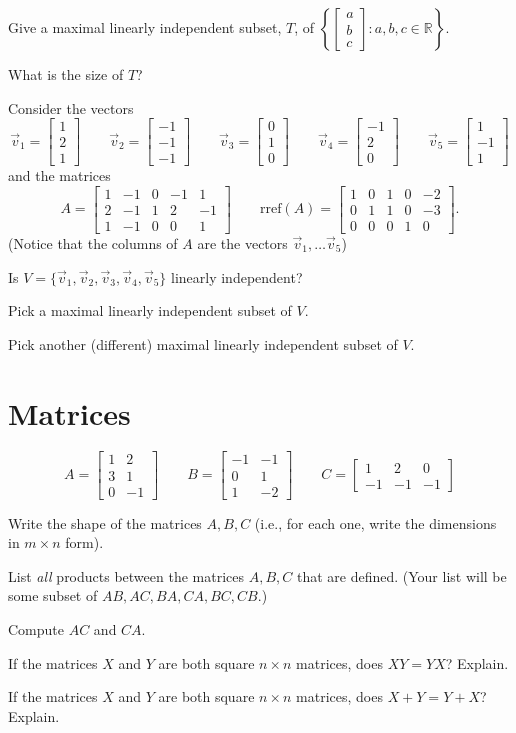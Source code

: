 \documentclass{article}
\newcommand{\R}{\mathbb{R}}
\newcommand{\rref}{\mathrm{rref}}
\newcommand{\mat}[1]{\begin{bmatrix}#1\end{bmatrix}}
\begin{document}
	\begin{Enum}
		\item Give a maximal linearly independent subset, $T$, of
		$\left\{\mat{a\\b\\c}:a,b,c\in \R\right\}$.
		\item What is the size of $T$?
	\end{Enum}

	Consider the vectors
	\[
		\vec v_1=\mat{1\\2\\1}
		\qquad
		\vec v_2=\mat{-1\\-1\\-1}
		\qquad
		\vec v_3=\mat{0\\1\\0}
		\qquad
		\vec v_4=\mat{-1\\2\\0}
		\qquad
		\vec v_5=\mat{1\\-1\\1}
	\]
	and the matrices
	\[
		A=\mat{1&-1&0&-1&1\\ 2&-1&1&2&-1\\1 & -1&0&0&1}
		\qquad \rref (A)
		=\mat{1&0&1&0&-2\\0&1&1&0&-3\\0&0&0&1&0}.
	\]
	(Notice that the columns of $A$ are the vectors $\vec v_1,\ldots \vec v_5$)

	\begin{Enum}
		\item Is $V=\{\vec v_1,\vec v_2,\vec v_3,\vec v_4,\vec v_5\}$ linearly
		independent?
		\item Pick a maximal linearly independent subset of $V$.
		\item Pick another (different) maximal linearly independent subset of $V$.
	\end{Enum}

\newpage
\section*{Matrices}
	\[
		A=\mat{1&2\\3&1\\0&-1}
		\qquad
		B=\mat{-1&-1\\0&1\\1&-2}
		\qquad
		C=\mat{1&2&0\\-1&-1&-1}
	\]
	\begin{Enum}
		\item Write the shape of the matrices $A,B,C$ (i.e., for each one,
		write the dimensions in $m\times n$ form).
		\item List \emph{all} products between the matrices $A,B,C$ that are
		defined. (Your list will be some subset of $AB,AC,BA,CA,BC,CB$.)
		\item Compute $AC$ and $CA$.
	\end{Enum}
	\begin{Enum}
		\item If the matrices $X$ and $Y$ are both square $n\times n$ matrices,
		does $XY=YX$?  Explain.
		\item If the matrices $X$ and $Y$ are both square $n\times n$ matrices,
		does $X+Y=Y+X$?  Explain.
	\end{Enum}
\end{document}
